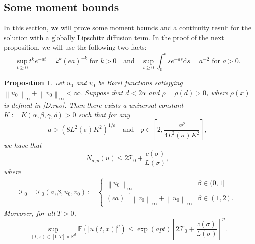 \documentclass[12pt]{report}
\theoremstyle{plain}
\newtheorem{proposition}[theorem]{Proposition}
\theoremstyle{definition}
\numberwithin{equation}{section}
\newcommand{\R}{\mathbb{R}}
\newcommand{\Norm}[1]{\left\|  #1   \right\|}
\newcommand{\ud}{\ensuremath{ \mathrm{d} }}
\begin{document}
\subsection{Some moment bounds}

In this section, we will prove some moment bounds and a continuity result for the solution with a globally Lipschitz diffusion term. In the proof of the next proposition, we will use the following two facts:
\begin{equation}
\label{E:SUPidentities}
\sup_{t\ge0} t^ke^{-at} = k^k(ea)^{-k} \text{ for }k > 0 \quad \text{and} \quad \sup_{t \ge 0} \int_0^t s e^{-as} \ud s = a^{-2} \text{ for } a>0.
\end{equation}

\begin{proposition}{\normalfont\cite[Proposition 3.2]{millet.sanz-sole:21:global}}
	\label{P:N(u)Bdd}
	Let $u_0$ and $v_0$ be Borel functions satisfying $\Norm{u_0}_\infty + \Norm{v_0}_\infty < \infty$. Suppose that $d < 2 \alpha$ and $\rho = \rho(d) > 0$, where $\rho(x)$ is defined in \eqref{D:rho}. Then there exists a universal constant $K:=K(\alpha, \beta, \gamma,d) >0$ such that for any 
	\[
	a > \left( 8 L^2(\sigma)K^2\right)^{1/\rho} 
	\quad \text{and} \quad
	p \in \left[ 2, \frac{a^{\rho}}{4L^2(\sigma)K^2} \right],
	\]
	we have that 
	\begin{equation}
	\label{E:Nbdd}
	N_{a,p}(u)  \le 2 \mathcal{T}_0 +  \frac{c(\sigma)}{L(\sigma)},
	\end{equation}	
	where
	\begin{align*}
	\mathcal{T}_0 = \mathcal{T}_0(a, \beta, u_0, v_0)  := \begin{cases} 
	\Norm{u_0}_\infty  & \beta \in (0,1]
	\\ (ea)^{-1} \Norm{v_0}_\infty + \Norm{u_0}_\infty & \beta \in (1,2).
	\end{cases} 
	\end{align*}
	Moreover, for all $T>0$,
	\begin{equation}
	\label{E:Pnormtbdd}
	\sup_{(t,x) \in [0,T] \times \R^d} \mathbb{E}(|u(t,x)|^p) \le \exp\left( a p t  \right) \left[ 2 \mathcal{T}_0 + \frac{ c(\sigma) }{L(\sigma)} \right]^p.
	\end{equation}
\end{proposition}
\end{document}
